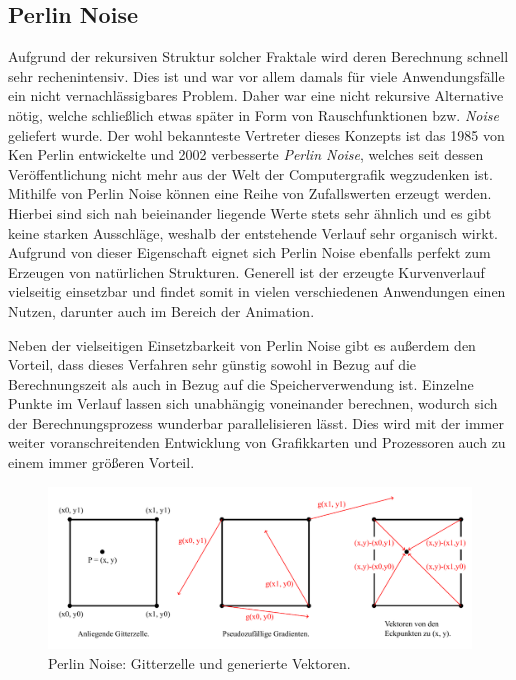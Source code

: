 \subsection{Perlin Noise}
Aufgrund der rekursiven Struktur solcher Fraktale wird deren Berechnung schnell sehr rechenintensiv. Dies ist und war vor allem
damals für viele Anwendungsfälle ein nicht vernachlässigbares Problem. \cite{24_blatz_korn} Daher war eine nicht rekursive
Alternative nötig, welche schließlich etwas später in Form von Rauschfunktionen bzw. \textit{Noise} geliefert wurde. Der wohl
bekannteste Vertreter dieses Konzepts ist das 1985 von Ken Perlin entwickelte \cite{16_perlin} und 2002 verbesserte \cite{18_perlin}
\textit{Perlin Noise}, welches seit dessen Veröffentlichung nicht mehr aus der Welt der Computergrafik wegzudenken ist. Mithilfe von
Perlin Noise können eine Reihe von Zufallswerten erzeugt werden. Hierbei sind sich nah beieinander liegende Werte stets sehr ähnlich und
es gibt keine starken Ausschläge, weshalb der entstehende Verlauf sehr organisch wirkt. Aufgrund von dieser Eigenschaft eignet sich
Perlin Noise ebenfalls perfekt zum Erzeugen von natürlichen Strukturen. Generell ist der erzeugte Kurvenverlauf vielseitig einsetzbar
und findet somit in vielen verschiedenen Anwendungen einen Nutzen, darunter auch im Bereich der Animation. \cite{17_lagae_et_al}

Neben der vielseitigen Einsetzbarkeit von Perlin Noise gibt es außerdem den Vorteil, dass dieses Verfahren sehr günstig sowohl in Bezug auf
die Berechnungszeit als auch in Bezug auf die Speicherverwendung ist. Einzelne Punkte im Verlauf lassen sich unabhängig voneinander berechnen,
wodurch sich der Berechnungsprozess wunderbar parallelisieren lässt. Dies wird mit der immer weiter voranschreitenden Entwicklung von
Grafikkarten und Prozessoren auch zu einem immer größeren Vorteil. \cite{17_lagae_et_al}

\begin{figure}[t]
    \centering
    \includegraphics[width=\imgWidth]{images/perlin_noise.pdf}
    \caption{Perlin Noise: Gitterzelle und generierte Vektoren.}
    \label{fig:perlin_noise}
\end{figure}

